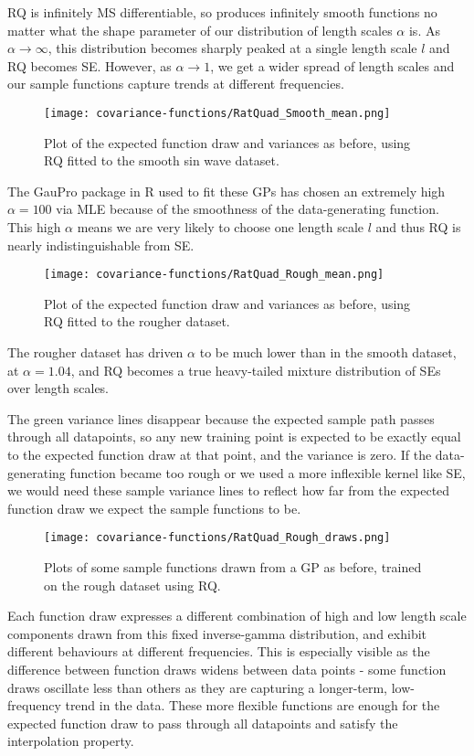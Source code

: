 RQ is infinitely MS differentiable, so produces infinitely smooth functions no matter what the shape parameter of our distribution of length scales $\alpha$ is. As $\alpha \to \infty$, this distribution becomes sharply peaked at a single length scale $l$ and RQ becomes SE. However, as $\alpha \to 1$, we get a wider spread of length scales and our sample functions capture trends at different frequencies. 

\begin{figure}[H]
    \texttt{[image: covariance-functions/RatQuad\_Smooth\_mean.png]}
    \caption{
        Plot of the expected function draw and variances as before, using RQ fitted to the smooth sin wave dataset.
    }
\end{figure}
The GauPro package \cite{gaupro} in R used to fit these GPs has chosen an extremely high $\alpha = 100$ via MLE because of the smoothness of the data-generating function. This high $\alpha$ means we are very likely to choose one length scale $l$ and thus RQ is nearly indistinguishable from SE.

\begin{figure}[H]
    \texttt{[image: covariance-functions/RatQuad\_Rough\_mean.png]}
    \caption{
        Plot of the expected function draw and variances as before, using RQ fitted to the rougher dataset. \\
    }
\end{figure}
The rougher dataset has driven $\alpha$ to be much lower than in the smooth dataset, at $\alpha = 1.04$, and RQ becomes a true heavy-tailed mixture distribution of SEs over length scales.

The green variance lines disappear because the expected sample path passes through all datapoints, so any new training point is expected to be exactly equal to the expected function draw at that point, and the variance is zero. If the data-generating function became too rough or we used a more inflexible kernel like SE, we would need these sample variance lines to reflect how far from the expected function draw we expect the sample functions to be. 

\begin{figure}[H]
    \texttt{[image: covariance-functions/RatQuad\_Rough\_draws.png]}
    \caption{
        Plots of some sample functions drawn from a GP as before, trained on the rough dataset using RQ.
    }
\end{figure}
Each function draw expresses a different combination of high and low length scale components drawn from this fixed inverse-gamma distribution, and exhibit different behaviours at different frequencies. This is especially visible as the difference between function draws widens between data points - some function draws oscillate less than others as they are capturing a longer-term, low-frequency trend in the data. These more flexible functions are enough for the expected function draw to pass through all datapoints and satisfy the interpolation property.

